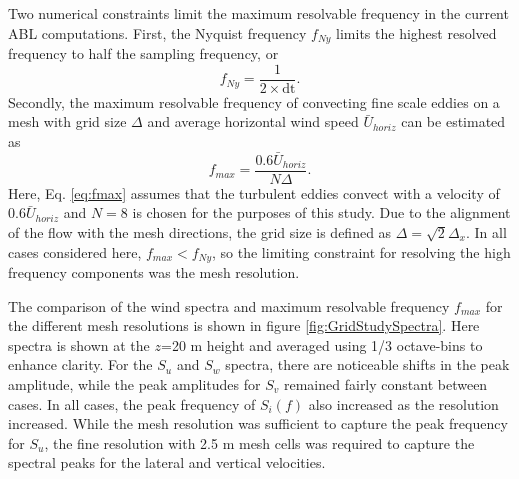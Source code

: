 Two numerical constraints limit the maximum resolvable frequency in
the current ABL computations.  First, the Nyquist frequency $f_{Ny}$
limits the highest resolved frequency to half the sampling frequency, or
\begin{equation}
  f_{Ny} = \frac{1}{2\times \textrm{dt}}.
\end{equation}
Secondly, the maximum resolvable frequency of convecting fine scale
eddies on a mesh with grid size $\Delta$ and average horizontal wind
speed $\bar{U}_{horiz}$ can be estimated as
\begin{equation}
  \label{eq:fmax}
  f_{max} = \frac{0.6\bar{U}_{horiz}}{N\Delta}.
\end{equation}
Here, Eq. \ref{eq:fmax} assumes that the turbulent eddies convect
with a velocity of $0.6\bar{U}_{horiz}$ and $N=8$ is chosen for the
purposes of this study.  Due to the alignment of the flow with the
mesh directions, the grid size is defined as $\Delta = \sqrt{2} \Delta_x $.
In all cases considered here, $f_{max} < f_{Ny}$, so the limiting
constraint for resolving the high frequency components was the mesh
resolution.

The comparison of the wind spectra and maximum resolvable frequency
$f_{max}$ for the different mesh resolutions is shown in figure
\ref{fig:GridStudySpectra}.  Here spectra is shown at the $z$=20 m
height and averaged using 1/3 octave-bins to enhance clarity. For the
$S_u$ and $S_w$ spectra, there are noticeable shifts in the peak
amplitude, while the peak amplitudes for $S_v$ remained fairly
constant between cases.  In all cases, the peak frequency of $S_i(f)$
also increased as the resolution increased. While the mesh resolution
was sufficient to capture the peak frequency for $S_u$, the fine
resolution with 2.5 m mesh cells was required to capture the spectral
peaks for the lateral and vertical velocities.


